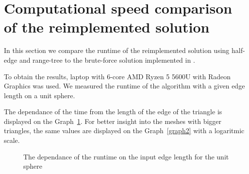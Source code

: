 \section{Computational speed comparison of the reimplemented solution}
\label{sub4.3}
In this section we compare the runtime of the reimplemented solution using half-edge 
and range-tree to the brute-force solution implemented in \cite{korecova2021triangulation}.

To obtain the results, laptop with 6-core AMD Ryzen 5 5600U with Radeon Graphics was used.
We measured the runtime of the algorithm with a given edge length on a unit sphere.

The dependance of the time from the length of the edge of the triangle is
displayed on the Graph~\ref{graph1}.
For better insight into the meshes with bigger triangles, the same values are 
displayed on the Graph~\ref{graph2} with a logaritmic scale.

\renewcommand{\figurename}{Graph}
\begin{figure}
    \centering
{}
\caption[The dependance of the runtime on the input edge length for the unit sphere]
{The dependance of the runtime on the input edge length for the unit sphere}
\label{graph1}
\end{figure}

